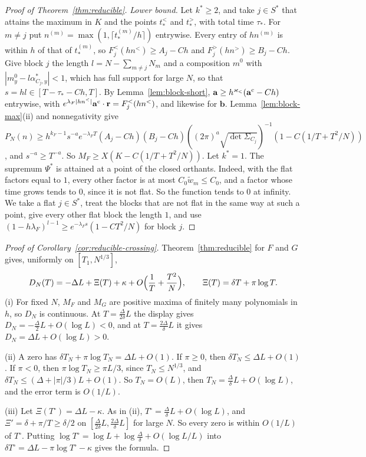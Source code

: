 \begin{proof}[Proof of Theorem~\ref{thm:reducible}]
\emph{Lower bound.} Let $k^*\ge2$, and take $j\in S^*$ that attains the maximum in $K$ and the
points $t^<_*$ and $t^>_*$, with total time $\tau_*$. For $m\ne j$ put
$n^{(m)}=\max(1,\lceil t^{(m)}_*/h\rceil)$ entrywise. Every entry of $hn^{(m)}$ is within $h$ of
that of $t^{(m)}_*$, so $F^<_j(hn^<)\ge A_j-Ch$ and $F^>_j(hn^>)\ge B_j-Ch$. Give block $j$ the
length $l=N-\sum_{m\ne j}N_m$ and a composition $m^0$ with $|m^0_y-l\alpha^*_{C_j,y}|<1$, which has
full support for large $N$, so that $s=hl\in[T-\tau_*-Ch,T]$. By Lemma~\ref{lem:block-short},
$\mathbf a\ge h^{\varkappa_<}(\mathbf a^{\rm c}-Ch)$ entrywise, with
$e^{\lambda_F|hn^<|}\mathbf a^{\rm c}\cdot\mathbf r=F^<_j(hn^<)$, and likewise for $\mathbf b$.
Lemma~\ref{lem:block-max}(ii) and nonnegativity give
$P_N(n)\ge h^{k_F-1}s^{-a}e^{-\lambda_FT}(A_j-Ch)(B_j-Ch)((2\pi)^a\sqrt{\det\Sigma_{C_j}})^{-1}(1-C(1/T+T^2/N))$,
and $s^{-a}\ge T^{-a}$. So $M_F\ge X(K-C(1/T+T^2/N))$. Let $k^*=1$. The supremum $\Psi^*$ is
attained at a point of the closed orthants. Indeed, with the flat factors equal to $1$, every
other factor is at most $C_0\tilde w_m\le C_0$, and a factor whose time grows tends to $0$, since
it is not flat. So the function tends to $0$ at infinity. We take a flat $j\in S^*$, treat the
blocks that are not flat in the same way at such a point, give every other flat block the length $1$,
and use $(1-h\lambda_F)^{l-1}\ge e^{-\lambda_Fs}(1-CT^2/N)$ for block $j$.
\end{proof}

\begin{proof}[Proof of Corollary~\ref{cor:reducible-crossing}]
Theorem~\ref{thm:reducible} for $F$ and $G$ gives, uniformly on $[T_1,N^{1/3}]$,
\[
D_N(T)=-\Delta L+\Xi(T)+\kappa+O\Bigl(\frac1T+\frac{T^2}N\Bigr),\qquad\Xi(T)=\delta T+\pi\log T .
\]
(i) For fixed $N$, $M_F$ and $M_G$ are positive maxima of finitely many polynomials in $h$, so
$D_N$ is continuous. At $T=\frac\Delta{2\delta}L$ the display gives $D_N=-\frac\Delta2L+O(\log L)<0$,
and at $T=\frac{2\Delta}\delta L$ it gives $D_N=\Delta L+O(\log L)>0$.

(ii) A zero has $\delta T_N+\pi\log T_N=\Delta L+O(1)$. If $\pi\ge0$, then $\delta T_N\le\Delta L+O(1)$.
If $\pi<0$, then $\pi\log T_N\ge\pi L/3$, since $T_N\le N^{1/3}$, and
$\delta T_N\le(\Delta+|\pi|/3)L+O(1)$. So $T_N=O(L)$, then $T_N=\frac\Delta\delta L+O(\log L)$, and
the error term is $O(1/L)$.

(iii) Let $\Xi(T^\circ)=\Delta L-\kappa$. As in (ii), $T^\circ=\frac\Delta\delta L+O(\log L)$, and
$\Xi'=\delta+\pi/T\ge\delta/2$ on $[\frac\Delta{2\delta}L,\frac{2\Delta}\delta L]$ for large $N$.
So every zero is within $O(1/L)$ of $T^\circ$. Putting
$\log T^\circ=\log L+\log\frac\Delta\delta+O(\log L/L)$ into $\delta T^\circ=\Delta L-\pi\log T^\circ-\kappa$
gives the formula.
\end{proof}

